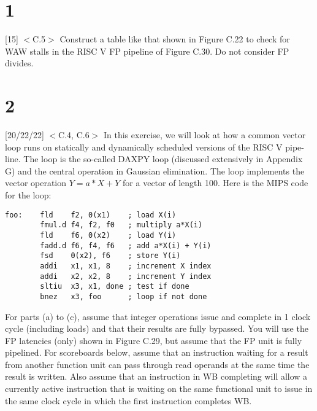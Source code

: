 \documentclass[11pt]{article}
\begin{document}

\section*{1}

[15] $<$C.5$>$ Construct a table like that shown in Figure C.22 to check for WAW stalls in the RISC V FP pipeline of Figure C.30. Do not consider FP divides.

\begin{Answer}

\end{Answer}

\newpage
\section*{2}

[20/22/22] $<$C.4, C.6$>$ In this exercise, we will look at how a common vector loop runs on statically and dynamically scheduled versions of the RISC V pipe- line. The loop is the so-called DAXPY loop (discussed extensively in Appendix G) and the central operation in Gaussian elimination. The loop implements the vector operation $Y=a*X+Y$ for a vector of length 100. Here is the MIPS code for the loop:


\begin{verbatim}
foo:    fld    f2, 0(x1)    ; load X(i)
        fmul.d f4, f2, f0   ; multiply a*X(i)
        fld    f6, 0(x2)    ; load Y(i)
        fadd.d f6, f4, f6   ; add a*X(i) + Y(i)
        fsd    0(x2), f6    ; store Y(i)
        addi   x1, x1, 8    ; increment X index
        addi   x2, x2, 8    ; increment Y index
        sltiu  x3, x1, done ; test if done
        bnez   x3, foo      ; loop if not done
\end{verbatim}

For parts (a) to (c), assume that integer operations issue and complete in 1 clock cycle (including loads) and that their results are fully bypassed. You will use the FP latencies (only) shown in Figure C.29, but assume that the FP unit is fully pipelined. For scoreboards below, assume that an instruction waiting for a result from another function unit can pass through read operands at the same time the result is written. Also assume that an instruction in WB completing will allow a currently active instruction that is waiting on the same functional unit to issue in the same clock cycle in which the first instruction completes WB.
\end{document}

